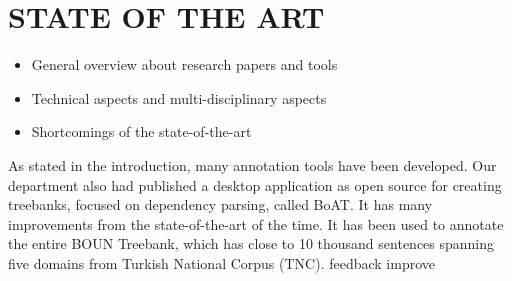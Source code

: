 \chapter{STATE OF THE ART}
\label{chapter:state-of-the-art}
\begin{itemize}
\item General overview about research papers and tools
\item Technical aspects and multi-disciplinary aspects
\item Shortcomings of the state-of-the-art
\end{itemize}
As stated in the introduction, many annotation tools have been developed. Our department also had published a desktop application as open source for creating treebanks, focused on dependency parsing, called BoAT. It has many improvements from the state-of-the-art of the time. It has been used to annotate the entire BOUN Treebank, which has close to 10 thousand sentences spanning five domains from Turkish National Corpus (TNC). feedback improve
